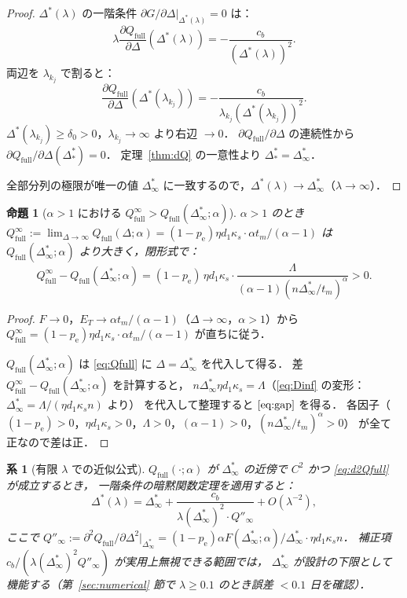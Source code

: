 \documentclass[12pt,a4paper]{article}
\theoremstyle{plain}
\newtheorem{proposition}[theorem]{命題}
\newtheorem{corollary}[theorem]{系}
\theoremstyle{definition}
\theoremstyle{remark}
\newcommand{\pe}{p_{\mathrm{e}}}
\newcommand{\Qf}{Q_{\mathrm{full}}}
\newcommand{\Dopt}{\Delta^{*}}
\newcommand{\Dinf}{\Delta^{*}_{\infty}}
\newcommand{\La}{\Lambda}
\begin{document}
\begin{proof}
$\Dopt(\lambda)$ の一階条件 $\partial G/\partial\Delta|_{\Dopt(\lambda)}=0$ は：
\[
\lambda\frac{\partial\Qf}{\partial\Delta}(\Dopt(\lambda))=-\frac{c_b}{(\Dopt(\lambda))^2}.
\]
両辺を $\lambda_{k_j}$ で割ると：
\[
\frac{\partial\Qf}{\partial\Delta}(\Dopt(\lambda_{k_j}))
=-\frac{c_b}{\lambda_{k_j}(\Dopt(\lambda_{k_j}))^2}.
\]
$\Dopt(\lambda_{k_j})\ge\delta_0>0$，$\lambda_{k_j}\to\infty$ より右辺 $\to0$．
$\partial\Qf/\partial\Delta$ の連続性から
$\partial\Qf/\partial\Delta(\Dopt_*)=0$．
定理~\ref{thm:dQ} の一意性より $\Dopt_*=\Dinf$．

全部分列の極限が唯一の値 $\Dinf$ に一致するので，$\Dopt(\lambda)\to\Dinf$（$\lambda\to\infty$）．
\end{proof}

\begin{proposition}[$\alpha>1$ における $\Qf^\infty>\Qf(\Dinf;\alpha)$]\label{prop:gap}
$\alpha>1$ のとき $\Qf^\infty:=\lim_{\Delta\to\infty}\Qf(\Delta;\alpha)=(1-\pe)\eta d_1\kappa_s\cdot\alpha t_m/(\alpha-1)$ は
$\Qf(\Dinf;\alpha)$ より大きく，閉形式で：
\begin{equation}\label{eq:gap}
\Qf^\infty-\Qf(\Dinf;\alpha)
=(1-\pe)\,\eta d_1\kappa_s\cdot\frac{\La}{(\alpha-1)(n\Dinf/t_m)^\alpha}>0.
\end{equation}
\end{proposition}

\begin{proof}
$F\to0$，$E_T\to\alpha t_m/(\alpha-1)$（$\Delta\to\infty$，$\alpha>1$）から
$\Qf^\infty=(1-\pe)\eta d_1\kappa_s\cdot\alpha t_m/(\alpha-1)$ が直ちに従う．

$\Qf(\Dinf;\alpha)$ は \eqref{eq:Qfull} に $\Delta=\Dinf$ を代入して得る．
差 $\Qf^\infty-\Qf(\Dinf;\alpha)$ を計算すると，
$n\Dinf\eta d_1\kappa_s=\La$（\eqref{eq:Dinf} の変形：$\Dinf=\La/(\eta d_1\kappa_s n)$ より）
を代入して整理すると $\eqref{eq:gap}$ を得る．
各因子（$(1-\pe)>0$，$\eta d_1\kappa_s>0$，$\La>0$，$(\alpha-1)>0$，$(n\Dinf/t_m)^\alpha>0$）
が全て正なので差は正．
\end{proof}

\begin{corollary}[有限 $\lambda$ での近似公式]\label{cor:taylor}
$\Qf(\cdot;\alpha)$ が $\Dinf$ の近傍で $C^2$ かつ \eqref{eq:d2Qfull} が成立するとき，
一階条件の暗黙関数定理を適用すると：
\begin{equation}\label{eq:taylor}
\Dopt(\lambda)=\Dinf+\frac{c_b}{\lambda(\Dinf)^2\cdot Q''_{\infty}}+O(\lambda^{-2}),
\end{equation}
ここで $Q''_{\infty}:=\partial^2\Qf/\partial\Delta^2|_{\Dinf}=(1-\pe)\alpha F(\Dinf;\alpha)/\Dinf\cdot\eta d_1\kappa_s n$．
補正項 $c_b/(\lambda(\Dinf)^2 Q''_{\infty})$ が実用上無視できる範囲では，
$\Dinf$ が設計の下限として機能する（第~\ref{sec:numerical} 節で $\lambda\ge0.1$ のとき誤差 $<0.1$ 日を確認）．
\end{corollary}
\end{document}

